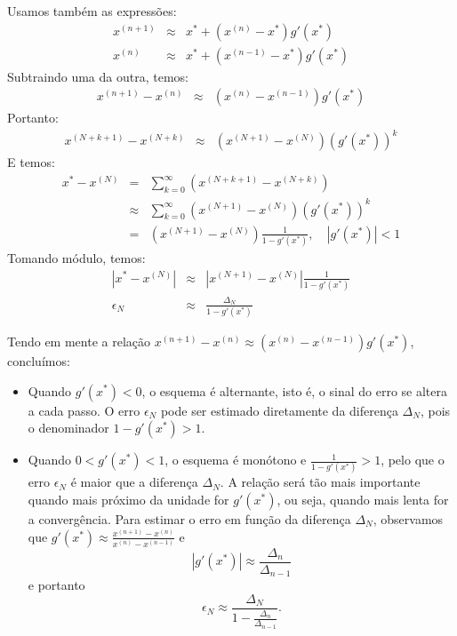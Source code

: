 Usamos também as expressões:
\begin{eqnarray}
x^{(n+1)}&\approx& x^*+(x^{(n)}-x^*) g'(x^*)\\
x^{(n)}&\approx& x^*+(x^{(n-1)}-x^*) g'(x^*)
\end{eqnarray}
Subtraindo uma da outra, temos:
\begin{eqnarray}
x^{(n+1)}-x^{(n)}&\approx& (x^{(n)}-x^{(n-1)}) g'(x^*)
\end{eqnarray}
Portanto:
\begin{eqnarray}
x^{(N+k+1)}-x^{(N+k)}&\approx& (x^{(N+1)}-x^{(N)}) \left(g'(x^*)\right)^{k}
\end{eqnarray}
E temos:
\begin{eqnarray}
x^*-x^{(N)}
&=&\sum_{k=0}^\infty \left(x^{(N+k+1)}-x^{(N+k)}\right)\\
&\approx&\sum_{k=0}^\infty (x^{(N+1)}-x^{(N)}) \left(g'(x^*)\right)^{k}\\
&=&(x^{(N+1)}-x^{(N)}) \frac{1}{1-g'(x^*)}, \quad \left|g'(x^*)\right|<1
\end{eqnarray}
Tomando módulo, temos:
\begin{eqnarray}
\left|x^*-x^{(N)} \right|
&\approx&\left|x^{(N+1)}-x^{(N)}\right| \frac{1}{1-g'(x^*)}\\
\epsilon_N &\approx&  \frac{\Delta_N}{1-g'(x^*)}
\end{eqnarray}

\begin{obs}
Tendo em mente a relação $x^{(n+1)}-x^{(n)}  \approx (x^{(n)}-x^{(n-1)}) g'(x^*)$, concluímos:
\begin{itemize}

\item Quando $g'(x^*)<0$, o esquema é alternante, isto é, o sinal do erro se altera a cada passo.  O erro $\epsilon_N$ pode ser estimado diretamente da diferença $\Delta_N$, pois o denominador $1-g'(x^*)>1$.
\item Quando $0<g'(x^*)<1$, o esquema é monótono e $\frac{1}{1-g'(x^*)}>1$, pelo que o erro $\epsilon_N$ é maior que a diferença $\Delta_N$. A relação será tão mais importante quando mais próximo da unidade for $g'(x^*)$, ou seja, quando mais lenta for a convergência. Para estimar o erro em função da diferença $\Delta_N$, observamos que  $g'(x^*)\approx \frac{x^{(n+1)}-x^{(n)}}{x^{(n)}-x^{(n-1)}}$ e
\begin{equation} \left|g'(x^*)\right|\approx \frac{\Delta_n}{\Delta_{n-1}} \end{equation}
e portanto
\begin{equation} \epsilon_N \approx \frac{\Delta_N}{1-\frac{\Delta_n}{\Delta_{n-1}}}. \end{equation}
\end{itemize}
\end{obs}

